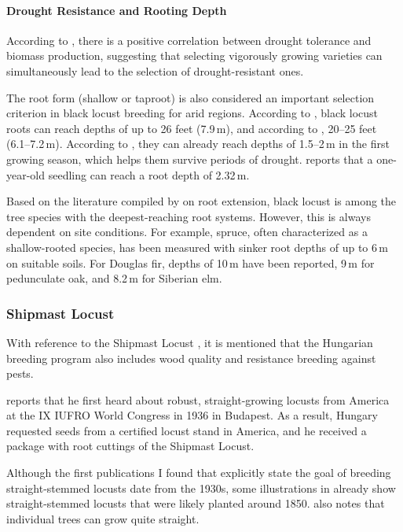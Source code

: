 \paragraph{Drought Resistance and Rooting Depth}

According to \citet{guse2011robinie}, there is a positive correlation between drought tolerance and biomass production, suggesting that selecting vigorously growing varieties can simultaneously lead to the selection of drought-resistant ones.

The root form (shallow or taproot) is also considered an important selection criterion in black locust breeding for arid regions. According to \citet{bunger1938robinieWurzeltiefe}, black locust roots can reach depths of up to 26 feet (7.9\,m), and according to \citet[p.~424]{harlow2000dendrology}, 20--25 feet (6.1--7.2\,m). According to \citet{lyr1967wurzel}, they can already reach depths of 1.5--2\,m in the first growing season, which helps them survive periods of drought. \citet[p.~38]{bluemke1955robinie} reports that a one-year-old seedling can reach a root depth of 2.32\,m.

Based on the literature compiled by \citet{stone1991wurzel} on root extension, black locust is among the tree species with the deepest-reaching root systems. However, this is always dependent on site conditions. For example, spruce, often characterized as a shallow-rooted species, has been measured with sinker root depths of up to 6\,m on suitable soils. For Douglas fir, depths of 10\,m have been reported, 9\,m for pedunculate oak, and 8.2\,m for Siberian elm.

\subsubsection{Shipmast Locust}

With reference to the Shipmast Locust \citep{raber1936shipmast}, it is mentioned that the Hungarian breeding program also includes wood quality and resistance breeding against pests.

\citet{mihalyi1937robinie} reports that he first heard about robust, straight-growing locusts from America at the IX IUFRO World Congress in 1936 in Budapest. As a result, Hungary requested seeds from a certified locust stand in America, and he received a package with root cuttings of the Shipmast Locust.

Although the first publications I found that explicitly state the goal of breeding straight-stemmed locusts date from the 1930s, some illustrations in \citet{vadas1911robinie} already show straight-stemmed locusts that were likely planted around 1850. \cite{gaskil1906robinie} also notes that individual trees can grow quite straight.

